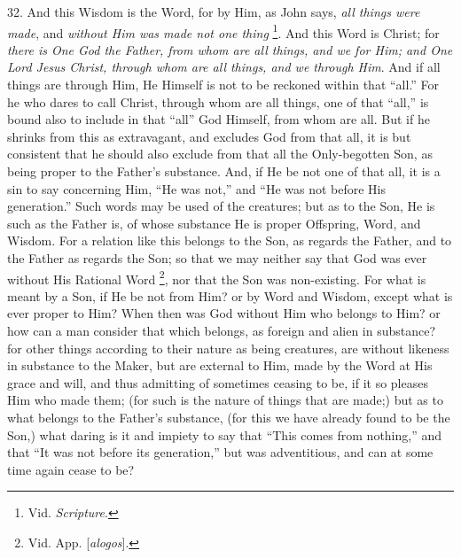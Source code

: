 32. And this Wisdom is the
Word, for by Him, as John says, \emph{all things were made}, and \emph{without
Him was made not one thing} \footnote{Vid. \emph{Scripture}.}. And this Word is Christ; for \emph{there is One God the Father,
from whom are all things, and we for Him; and One Lord Jesus Christ,
through whom are all things, and we through Him}. And if all things
are through Him, He Himself is not to be reckoned within that ``all.''
For he who dares to call Christ, through whom are all things, one of
that ``all,'' is bound also to include in that ``all'' God Himself, from
whom are all. But if he shrinks from this as extravagant, and excludes
God from that all, it is but consistent that he should also exclude
from that all the Only-begotten Son, as being proper to the Father's
substance. And, if He be not one of that all, it is a sin to say
concerning Him, ``He was not,'' and ``He was not before His generation.''
Such words may be used of the creatures; but as to the Son, He is such
as the Father is, of whose substance He is proper Offspring, Word, and
Wisdom. For a relation like this belongs to the Son, as regards the
Father, and to the Father as regards the Son; so that we may neither
say that God was ever without His Rational Word \footnote{Vid. App. [\emph{alogos}].}, nor that the Son was non-existing. For what is meant by a
Son, if He be not from Him? or by Word and Wisdom, except what is ever
proper to Him? When then was God without Him who belongs to Him? or
how can a man consider that which belongs, as foreign and alien in
substance? for other things according to their nature as being
creatures, are without likeness in substance to the Maker, but are
external to Him, made by the Word at His grace and will, and thus
admitting of sometimes ceasing to be, if it so pleases Him who made
them; (for such is the nature of things that are made;) but as to what
belongs to the Father's substance, (for this we have already found to
be the Son,) what daring is it and impiety to say that ``This comes
from nothing,'' and that ``It was not before its generation,'' but was
adventitious, and can at some time again cease to be?

